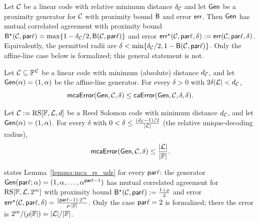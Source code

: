 \begin{lemma}\label{lemma:gen_mutual_corr_agreement}
    Let $\mathcal{C}$ be a linear code with relative minimum distance $\delta_{\mathcal{C}}$ and let $\mathsf{Gen}$ be a proximity generator for $\mathcal{C}$ with proximity bound ${\mathsf{B}}$ and error $\mathsf{err}$. Then $\mathsf{Gen}$ has mutual correlated agreement with proximity bound ${\mathsf{B}}^\star(\mathcal{C}, \mathsf{par}\ell) = \max\{1 - \delta_{\mathcal{C}}/2, \mathsf{B}(\mathcal{C}, \mathsf{par}\ell)\}$ and error $\mathsf{err}^\star(\mathcal{C}, \mathsf{par}\ell, \delta) := \mathsf{err}(\mathcal{C}, \mathsf{par}\ell, \delta)$. Equivalently, the permitted radii are $\delta < \min\{\delta_{\mathcal{C}}/2, 1-\mathsf{B}(\mathcal{C},\mathsf{par}\ell)\}$.
    Only the affine-line case below is formalized; this general statement is not.
\end{lemma}

\begin{lemma}\label{lemma:mca_affine_line_udr}
\leanok
{}
    Let $\mathcal{C}\subseteq\mathbb{F}^{\mathcal{L}}$ be a linear code with minimum (absolute) distance
    $d_{\mathcal{C}}$, and let $\mathsf{Gen}(\alpha)=(1,\alpha)$ be the affine-line generator. For every
    $\delta>0$ with $2\delta|\mathcal{L}|<d_{\mathcal{C}}$,
    \[
      \mathsf{mcaError}(\mathsf{Gen},\mathcal{C},\delta)\le\mathsf{caError}(\mathsf{Gen},\mathcal{C},\delta,\delta).
    \]
\end{lemma}

\begin{lemma}\label{lemma:mca_rs_udr}
\leanok
{}
    Let $\mathcal{C} := \mathrm{RS}[\mathbb{F}, \mathcal{L}, d]$ be a Reed Solomon code with minimum
    distance $d_{\mathcal{C}}$, and let $\mathsf{Gen}(\alpha)=(1,\alpha)$. For every $\delta$ with
    $0<\delta\le\frac{(d_{\mathcal{C}}-1)/2}{|\mathcal{L}|}$ (the relative unique-decoding radius),
    \[
      \mathsf{mcaError}(\mathsf{Gen},\mathcal{C},\delta)\le\frac{|\mathcal{L}|}{|\mathbb{F}|}.
    \]
\end{lemma}

\begin{remark}
\cite{ACFY24} states Lemma~\ref{lemma:mca_rs_udr} for every $\mathsf{par}\ell$: the generator
$\mathsf{Gen}(\mathsf{par}\ell; \alpha) = (1, \alpha, \ldots, \alpha^{\mathsf{par}\ell - 1})$ has mutual correlated agreement
for $\mathrm{RS}[\mathbb{F}, \mathcal{L}, 2^m]$ with proximity bound ${\mathsf{B}}^\star(\mathcal{C}, \mathsf{par}\ell) :=
\frac{1 + \rho}{2}$ and error $\mathsf{err}^\star(\mathcal{C}, \mathsf{par}\ell, \delta) = \frac{(\mathsf{par}\ell - 1) \cdot
2^m}{\rho \cdot |\mathbb{F}|}$. Only the case $\mathsf{par}\ell=2$ is formalized; there the error is
$2^m/(\rho|\mathbb{F}|)=|\mathcal{L}|/|\mathbb{F}|$.
\end{remark}


